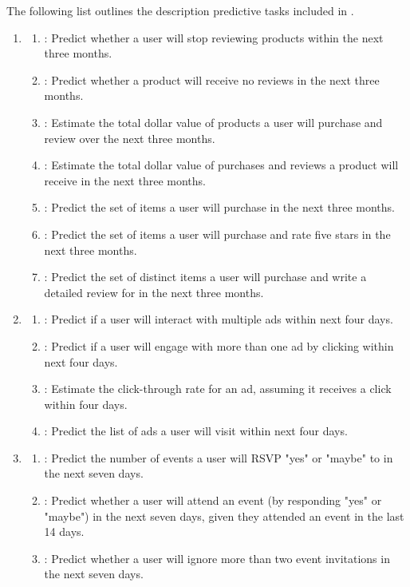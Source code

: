 \documentclass{article}
\theoremstyle{plain}
\theoremstyle{definition}
\theoremstyle{remark}
\begin{document}
The following list outlines the description predictive tasks included in \relbench. 
\begin{enumerate}
\item \amazonn

    \begin{enumerate}
    \item \userChurn: Predict whether a user will stop reviewing products within the next three months.
    \item \itemChurn: Predict whether a product will receive no reviews in the next three months.
    \item \userLtv: Estimate the total dollar value of products a user will purchase and review over the next three months.

    \item \itemLtv: Estimate the total dollar value of purchases and reviews a product will receive in the next three months.

    \item \userItemPurchase: Predict the set of items a user will purchase in the next three months.
    \item \userItemRate: Predict the set of items a user will purchase and rate five stars in the next three months.
    \item \userItemReview: Predict the set of distinct items a user will purchase and write a detailed review for in the next three months.
    \end{enumerate}
    
\item \avito

    
    \begin{enumerate}
    \item \userVisit: Predict if a user will interact with multiple ads within next four days.
    \item \userClick: Predict if a user will engage with more than one ad by clicking within next four days.
    \item \adsCTR: Estimate the click-through rate for an ad, assuming it receives a click within four days.
    \item \userAdVisit: Predict the list of ads a user will visit within next four days.
    \end{enumerate}

\item \event
    \begin{enumerate}
    \item \userAttendance: Predict the number of events a user will RSVP "yes" or "maybe" to in the next seven days.
    \item \userRepeat: Predict whether a user will attend an event (by responding "yes" or "maybe") in the next seven days, given they attended an event in the last 14 days.
    \item \userIgnore: Predict whether a user will ignore more than two event invitations in the next seven days.
    \end{enumerate}


\end{enumerate}
\end{document}
